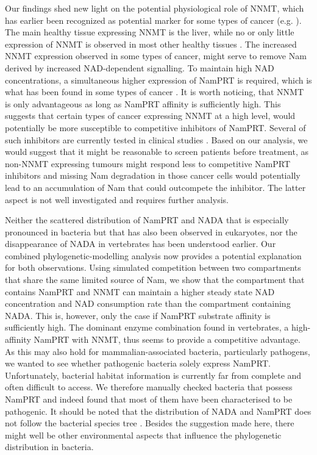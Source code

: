 Our findings shed new light on the potential physiological role of NNMT, which has earlier been recognized as potential marker for some types of cancer (e.g. \cite{Okamura1998}). The main healthy tissue expressing NNMT is the liver, while no or only little expression of NNMT is observed in most other healthy tissues \cite{Aksoy1994}. The increased NNMT expression observed in some types of cancer, might serve to remove Nam derived by increased NAD-dependent signalling. To maintain high NAD concentrations, a simultaneous higher expression of NamPRT is required, which is what has been found in some types of cancer \cite{Bi2011,Wang2011}. It is worth noticing, that NNMT is only advantageous as long as NamPRT affinity is sufficiently high. This suggests that certain types of cancer expressing NNMT at a high level, would potentially be more susceptible to competitive inhibitors of NamPRT. Several of such inhibitors are currently tested in clinical studies \cite{EspindolaNetto2017,Xu2015SR}. Based on our analysis, we would suggest that it might be reasonable to screen patients before treatment, as non-NNMT expressing tumours might respond less to competitive NamPRT inhibitors and missing Nam degradation in those cancer cells would potentially lead to an accumulation of Nam that could outcompete the inhibitor. The latter aspect is not well investigated and requires further analysis.

Neither the scattered distribution of NamPRT and NADA that is especially pronounced in bacteria \cite{Gazzaniga2009} but that has also been observed in eukaryotes, nor the disappearance of NADA in vertebrates has been understood earlier. Our combined phylogenetic-modelling analysis now provides a potential explanation for both observations. Using simulated competition between two compartments that share the same limited source of Nam, we show that the compartment that contains NamPRT and NNMT can maintain a higher steady state NAD concentration and NAD consumption rate than the compartment containing NADA. This is, however, only the case if NamPRT substrate affinity is sufficiently high. The dominant enzyme combination found in vertebrates, a high-affinity NamPRT with NNMT, thus seems to provide a competitive advantage. As this may also hold for mammalian-associated bacteria, particularly pathogens, we wanted to see whether pathogenic bacteria solely express NamPRT. Unfortunately, bacterial habitat information is currently far from complete and often difficult to access. We therefore manually checked bacteria that possess NamPRT and indeed found that most of them have been characterised to be pathogenic. It should be noted that the distribution of NADA and NamPRT does not follow the bacterial species tree \cite{Gazzaniga2009}. Besides the suggestion made here, there might well be other environmental aspects that influence the phylogenetic distribution in bacteria.

